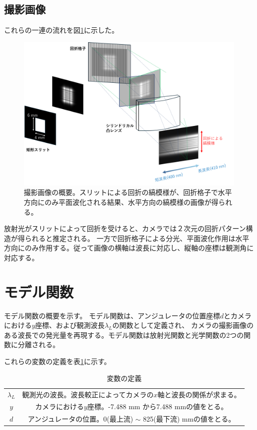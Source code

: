 \documentclass[a4paper,11pt,uplatex]{jsbook}
\begin{document}
\subsection{撮影画像}
これらの一連の流れを図\ref{propagation}に示した。
\begin{figure}[h]
  \centering
  \includegraphics[width=\linewidth]{image/2-propagation.png}
  \caption[撮影画像の概要]{撮影画像の概要。スリットによる回折の縞模様が、回折格子で水平方向にのみ平面波化される結果、水平方向の縞模様の画像が得られる。}
  \label{propagation}
\end{figure}
放射光がスリットによって回折を受けると、カメラでは２次元の回折パターン構造が得られると推定される。
一方で回折格子による分光、平面波化作用は水平方向にのみ作用する。従って画像の横軸は波長に対応し、縦軸の座標は観測角に対応する。

\section{モデル関数}
モデル関数の概要を示す。
モデル関数は、アンジュレータの位置座標$d$とカメラにおける$y$座標、および観測波長$\lambda_L$の関数として定義され、
カメラの撮影画像のある波長での発光量を再現する。モデル関数は放射光関数と光学関数の2つの関数に分離される。

これらの変数の定義を表\ref{tab:variables}に示す。
\begin{table}[h]
  \centering
  \begin{tabular}{c|c}
    $\lambda_L$ & 観測光の波長。波長較正によってカメラの$x$軸と波長の関係が求まる。\\
    $y$ & カメラにおける$y$座標。-7.488 mm から7.488 mmの値をとる。\\
    $d$ & アンジュレータの位置。0(最上流) $\sim$ 825(最下流) mmの値をとる。\\
  \end{tabular}
  \caption[変数の定義]{変数の定義}\label{tab:variables}
\end{table}
\end{document}
